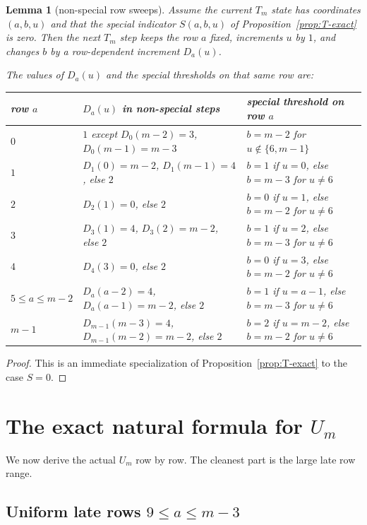 \documentclass[11pt]{article}
\newtheorem{lemma}[theorem]{Lemma}
\newcommand{\1}{\mathbf 1}
\begin{document}
\begin{lemma}[non-special row sweeps]\label{lem:non-special-dictionary}
Assume the current $T_m$ state has coordinates $(a,b,u)$ and that the special
indicator $S(a,b,u)$ of Proposition~\ref{prop:T-exact} is zero. Then the next
$T_m$ step keeps the row $a$ fixed, increments $u$ by $1$, and changes $b$ by a
row-dependent increment $D_a(u)$.

The values of $D_a(u)$ and the special thresholds on that same row are:

\begin{center}
\renewcommand{\arraystretch}{1.2}
\begin{tabular}{@{}lll@{}}
\toprule
row $a$ & $D_a(u)$ in non-special steps & special threshold on row $a$ \\
\midrule
$0$ & $1$ except $D_0(m-2)=3$, $D_0(m-1)=m-3$ & $b=m-2$ for $u\notin\{6,m-1\}$ \\
$1$ & $D_1(0)=m-2$, $D_1(m-1)=4$, else $2$ & $b=1$ if $u=0$, else $b=m-3$ for $u\ne6$ \\
$2$ & $D_2(1)=0$, else $2$ & $b=0$ if $u=1$, else $b=m-2$ for $u\ne6$ \\
$3$ & $D_3(1)=4$, $D_3(2)=m-2$, else $2$ & $b=1$ if $u=2$, else $b=m-3$ for $u\ne6$ \\
$4$ & $D_4(3)=0$, else $2$ & $b=0$ if $u=3$, else $b=m-2$ for $u\ne6$ \\
$5\le a\le m-2$ & $D_a(a-2)=4$, $D_a(a-1)=m-2$, else $2$ & $b=1$ if $u=a-1$, else $b=m-3$ for $u\ne6$ \\
$m-1$ & $D_{m-1}(m-3)=4$, $D_{m-1}(m-2)=m-2$, else $2$ & $b=2$ if $u=m-2$, else $b=m-2$ for $u\ne6$ \\
\bottomrule
\end{tabular}
\end{center}
\end{lemma}

\begin{proof}
This is an immediate specialization of Proposition~\ref{prop:T-exact} to the
case $S=0$.
\end{proof}

\section{The exact natural formula for $U_m$}

We now derive the actual $U_m$ row by row. The cleanest part is the large late
row range.

\subsection{Uniform late rows $9\le a\le m-3$}
\end{document}
